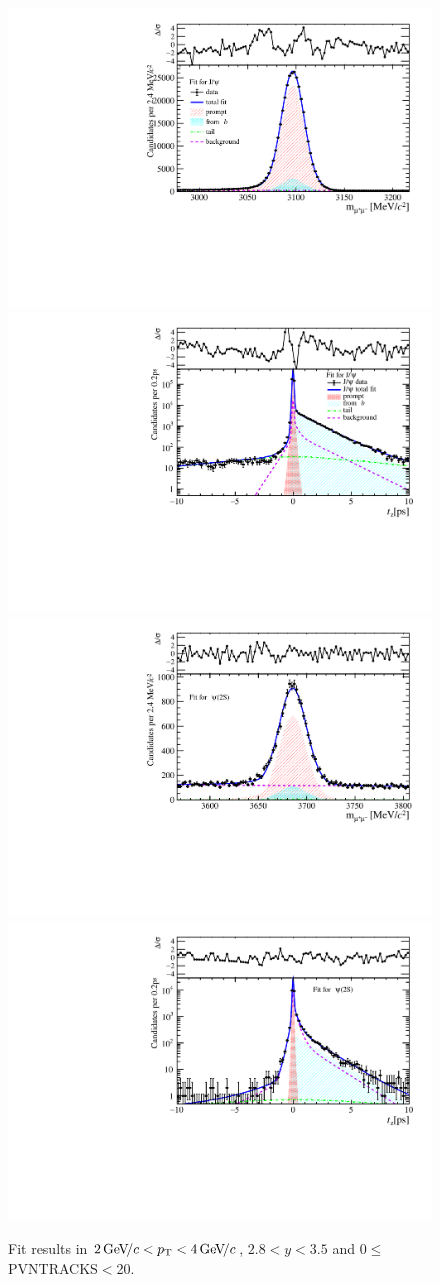 \begin{figure}[H]
\begin{center}
\includegraphics[width=0.47\linewidth]{pdf/Jpsi/drawmass/n1y2pt2.pdf}
\includegraphics[width=0.47\linewidth]{pdf/Jpsi/2DFit/n1y2pt2.pdf}
\vspace*{-0.5cm}
\includegraphics[width=0.47\linewidth]{pdf/Psi2S/drawmass/n1y2pt2.pdf}
\includegraphics[width=0.47\linewidth]{pdf/Psi2S/2DFit/n1y2pt2.pdf}
\vspace*{-0.5cm}
\end{center}
\caption{Fit results in $2\text{\,Ge\kern -0.1em V\!/}c<p_{\mathrm{T}}<4\text{\,Ge\kern -0.1em V\!/}c$, $2.8<y<3.5$ and 0$\leq$PVNTRACKS$<$20.}
\label{Fitn1y2pt2}
\end{figure}
